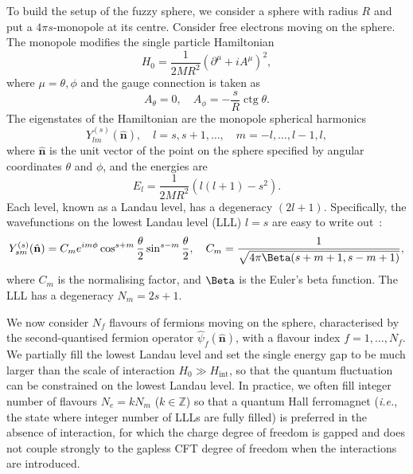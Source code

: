\documentclass{timesjhep}
\begin{document}
To build the setup of the fuzzy sphere, we consider a sphere with radius $R$ and put a $4\pi s$-monopole at its centre. Consider free electrons moving on the sphere. The monopole modifies the single particle Hamiltonian~\cite{Haldane1983LLL,Wu1976LLL,Greiter2011LLL,Hasebe2010LLL}
\begin{equation}
    H_0=\frac{1}{2MR^2}(\partial^\mu+iA^\mu)^2,
\end{equation} 
where $\mu=\theta,\phi$ and the gauge connection is taken as
\begin{equation}
    A_\theta=0,\quad A_\phi=-\frac{s}{R}\operatorname{ctg}\theta.
\end{equation}
The eigenstates of the Hamiltonian are the monopole spherical harmonics
\begin{equation}
    Y_{lm}^{(s)}(\hat{\mathbf{n}}),\quad l=s,s+1,\dots,\quad m=-l,\dots,l-1,l,
\end{equation}
where $\hat{\mathbf{n}}$ is the unit vector of the point on the sphere specified by angular coordinates $\theta$ and $\phi$, and the energies are
\begin{equation}
    E_l=\frac{1}{2MR^2}(l(l+1)-s^2).
\end{equation}
Each level, known as a Landau level, has a degeneracy $(2l+1)$. Specifically, the wavefunctions on the lowest Landau level (LLL) $l=s$ are easy to write out~:
\begin{equation}
    Y_{sm}^{(s)}(\hat{\mathbf{n}})=C_me^{im\phi}\cos^{s+m}\frac{\theta}{2}\sin^{s-m}\frac{\theta}{2},\quad C_m=\frac{1}{{\sqrt{4\pi\Beta(s+m+1,s-m+1)}}},
\end{equation}
where $C_m$ is the normalising factor, and $\Beta$ is the Euler's beta function. The LLL has a degeneracy $N_m=2s+1$.

We now consider $N_f$ flavours of fermions moving on the sphere, characterised by the second-quantised fermion operator $\hat{\psi}_f(\hat{\mathbf{n}})$, with a flavour index $f=1,\dots,N_f$. We partially fill the lowest Landau level and set the single energy gap to be much larger than the scale of interaction $H_0\gg H_\textrm{int}$, so that the quantum fluctuation can be constrained on the lowest Landau level. In practice, we often fill integer number of flavours $N_e=kN_m$ ($k\in\mathbb{Z}$) so that a quantum Hall ferromagnet (\textit{i.e.}, the state where integer number of LLLs are fully filled) is preferred in the absence of interaction, for which the charge degree of freedom is gapped and does not couple strongly to the gapless CFT degree of freedom when the interactions are introduced.
\end{document}
